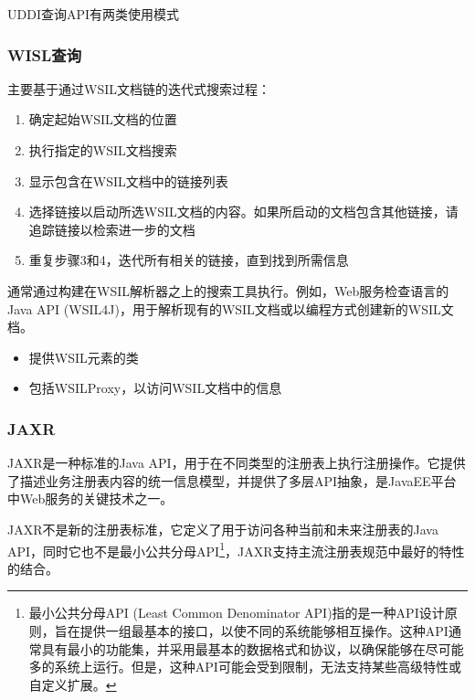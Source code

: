 UDDI查询API有两类使用模式
\vspace{-0.5em}
\begin{spacing}{1.2}
    \centering
    
\end{spacing}
\vspace{-1em}

\subsubsection{WISL查询}
主要基于通过WSIL文档链的迭代式搜索过程：
\begin{enumerate}[label=\arabic*.]
    \item 确定起始WSIL文档的位置
    \item 执行指定的WSIL文档搜索
    \item 显示包含在WSIL文档中的链接列表
    \item 选择链接以启动所选WSIL文档的内容。如果所启动的文档包含其他链接，请追踪链接以检索进一步的文档
    \item 重复步骤3和4，迭代所有相关的链接，直到找到所需信息
\end{enumerate}

通常通过构建在WSIL解析器之上的搜索工具执行。例如，Web服务检查语言的Java API (WSIL4J)，用于解析现有的WSIL文档或以编程方式创建新的WSIL文档。
\vspace{-0.8em}
\begin{multicols}{2}
    \begin{itemize}
        \item 提供WSIL元素的类
        \item 包括WSILProxy，以访问WSIL文档中的信息
    \end{itemize}
\end{multicols}
\vspace{-1em}

\subsubsection{JAXR}
JAXR是一种标准的Java API，用于在不同类型的注册表上执行注册操作。它提供了描述业务注册表内容的统一信息模型，并提供了多层API抽象，是JavaEE平台中Web服务的关键技术之一。

JAXR不是新的注册表标准，它定义了用于访问各种当前和未来注册表的Java API，同时它也不是最小公共分母API\footnote{最小公共分母API (Least Common Denominator API)指的是一种API设计原则，旨在提供一组最基本的接口，以使不同的系统能够相互操作。这种API通常具有最小的功能集，并采用最基本的数据格式和协议，以确保能够在尽可能多的系统上运行。但是，这种API可能会受到限制，无法支持某些高级特性或自定义扩展。}，JAXR支持主流注册表规范中最好的特性的结合。


